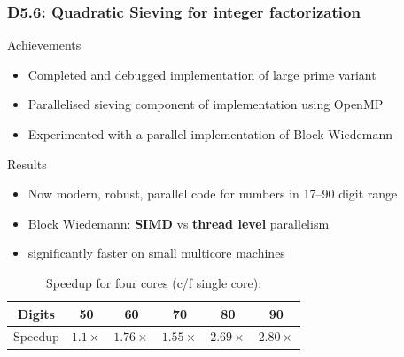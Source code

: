 \documentclass{beamer}
\begin{document}
\begin{frame}
  \frametitle{D5.6: Quadratic Sieving for integer factorization}
    \begin{block}{Achievements}
      \begin{itemize}
      \item Completed and debugged implementation of large prime variant
      \item Parallelised sieving component of implementation using OpenMP
      \item Experimented with a parallel implementation of Block Wiedemann
      \end{itemize}
\end{block}
\begin{block}{Results}

      \begin{itemize}
      \item Now modern, robust, parallel code for numbers in
        17--90 digit range
      \item Block Wiedemann:  \textbf{SIMD} vs \textbf{thread level}
        parallelism       \pause
      \item significantly faster on small multicore machines
      \end{itemize}
      \begin{center}
        \begin{table}
          \caption{Speedup for four cores (c/f single core): }
        \begin{tabular}{c|ccccc}
        \toprule
            {Digits} & 50 & 60 & 70 & 80 & 90\\
            \midrule
                {Speedup} & $1.1\times$ & $1.76\times$ & $1.55\times$ & $2.69\times$ & $2.80\times$\\
                \bottomrule
      \end{tabular}
\end{table}
      \end{center}
    \end{block}

\end{frame}
\end{document}
